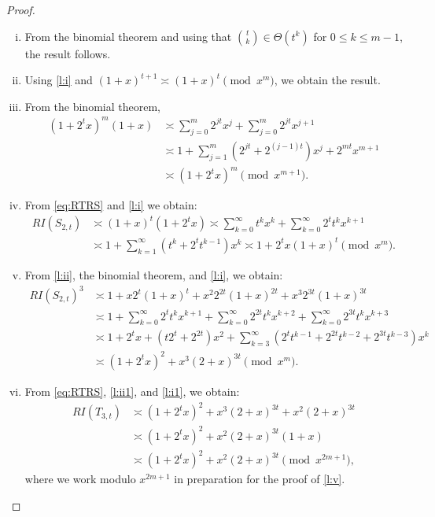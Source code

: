 \documentclass[reqno]{amsart}
\begin{document}
\begin{proof}
\begin{enumerate}[(i)]
\item
From the binomial theorem and using that $\binom{t}{k}\in\Theta(t^k)$ for $0\leq k\leq m-1$, the result follows.

\item Using \eqref{l:i} and  $(1+x)^{t+1}\asymp (1+x)^t\pmod{x^m}$, we obtain the result.
\item From the binomial theorem,
  \begin{align*}
    (1+2^tx)^m(1+x)&\asymp \sum_{j=0}^{m}2^{jt}x^j+\sum_{j=0}^m 2^{jt}x^{j+1}\\
    & \asymp 1+\sum_{j=1}^m(2^{jt}+2^{(j-1)t})x^j+2^{mt}x^{m+1}\\
    &\asymp (1+2^tx)^m\pmod{x^{m+1}}.
  \end{align*}
\item From \eqref{eq:RTRS} and \eqref{l:i} we obtain:
  \begin{align*}
    RI(S_{2,t})&\asymp (1+x)^t(1+2^tx)\asymp \sum_{k=0}^\infty t^kx^k+\sum_{k=0}^\infty 2^t t^k x^{k+1}\\               
               &\asymp 1+\sum_{k=1}^\infty (t^k+2^t t^{k-1})x^k\asymp 1+2^tx(1+x)^t\pmod{x^m}.
  \end{align*}




\item From \eqref{l:ii}, the binomial theorem, and \eqref{l:i}, we obtain:
\begin{align*}
RI(S_{2,t})^3&\asymp 1+x2^t(1+x)^t+x^2 2^{2t}(1+x)^{2t}+x^3 2^{3t}(1+x)^{3t}\\
&\asymp 1+\sum_{k=0}^\infty 2^tt^{k}x^{k+1}+\sum_{k=0}^\infty 2^{2t}t^{k}x^{k+2}+\sum_{k=0}^\infty 2^{3t}t^{k}x^{k+3}\\   
&\asymp 1+2^tx+(t2^{t}+2^{2t})x^2+\sum_{k=3}^\infty (2^{t}t^{k-1}+2^{2t}t^{k-2}+2^{3t}t^{k-3})x^k\\
&\asymp (1+2^tx)^{2}+x^3(2+x)^{3t} \pmod{x^m}.
\end{align*}

\item From \eqref{eq:RTRS}, \eqref{l:ii1}, and \eqref{l:i1}, we obtain:
\begin{align*}
RI(T_{3,t})&\asymp (1+2^tx)^{2}+x^3(2+x)^{3t}+x^{2}(2+x)^{3t}\\
&\asymp (1+2^tx)^{2}+x^{2}(2+x)^{3t}(1+x)\\
&\asymp (1+2^tx)^{2}+x^{2}(2+x)^{3t} \pmod{x^{2m+1}},
\end{align*}
where we work modulo \(x^{2m+1}\) in preparation for the proof of \eqref{l:v}.





\end{enumerate}
\end{proof}
\end{document}
